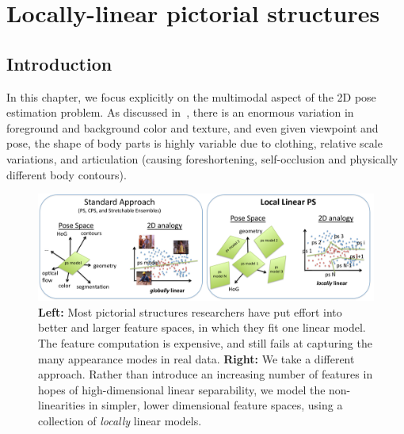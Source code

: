 \chapter{Locally-linear pictorial structures}\label{sec:llps}
\section{Introduction}

In this chapter, we focus explicitly on the multimodal aspect of the 2D pose 
estimation problem.  As discussed in~, there is an enormous 
variation in foreground and background color and texture, and even given 
viewpoint and pose, the shape of body parts is highly variable due to clothing, 
relative scale variations, and articulation (causing foreshortening, 
self-occlusion and physically different body contours).

\begin{figure}[t!]
\centering
\includegraphics[width=0.99\linewidth]{figs/llps-overview.pdf}
\caption[LLPS overview.]{\label{fig:overview} \textbf{Left:} Most pictorial 
structures researchers have put effort into better and larger feature spaces, 
in which they fit one linear model.  The feature computation is expensive, and
still fails at capturing the many appearance modes in real data.  
\textbf{Right:} We take a different approach.  Rather than introduce an 
increasing number of features in hopes of high-dimensional linear separability, 
we model the non-linearities in simpler, lower dimensional feature spaces, 
using a collection of {\em locally} linear models.}
\end{figure}


